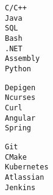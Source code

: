 \documentclass[9pt]{developercv} %
\begin{document}
\vspace{0.5cm}


\begin{minipage}[t]{0.3\textwidth}
	\vspace{-\baselineskip} %

	\begin{minipage}[t]{0.3\textwidth}
		\vspace{-\baselineskip} %
		
		
		{\texttt{C/C++}\\\texttt{Java}\\\texttt{SQL}\\\texttt{Bash}\\\texttt{.NET}\\\texttt{Assembly}\\\texttt{Python}}
	\end{minipage}
\end{minipage}
\hfill
\begin{minipage}[t]{0.3\textwidth}
	\vspace{-\baselineskip} %
	
	
	{\texttt{Depigen}\\\texttt{Ncurses}\\\texttt{Curl}\\\texttt{Angular}\\\texttt{Spring}}
\end{minipage}
\hfill
\begin{minipage}[t]{0.3\textwidth}
	\vspace{-\baselineskip} %
	
	
	{\texttt{Git}\\\texttt{CMake}\\\texttt{Kubernetes}\\\texttt{Atlassian}\\\texttt{Jenkins}}
\end{minipage}
\end{document}

